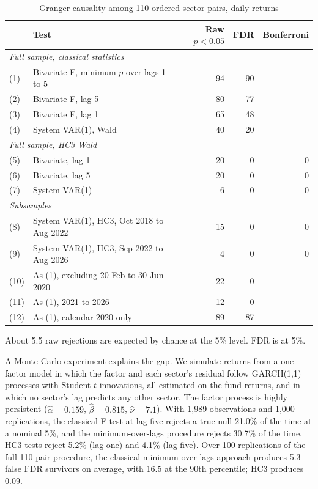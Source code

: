 \documentclass[11pt]{article}
\begin{document}
\begin{table}[H]
\centering
\caption{Granger causality among 110 ordered sector pairs, daily returns}
\label{tab:granger}
\small
\begin{tabular}{llrrr}
\toprule
& Test & Raw $p<0.05$ & FDR & Bonferroni \\
\midrule
\multicolumn{5}{l}{\textit{Full sample, classical statistics}} \\
(1) & Bivariate F, minimum $p$ over lags 1 to 5 & 94 & 90 & \\
(2) & Bivariate F, lag 5 & 80 & 77 & \\
(3) & Bivariate F, lag 1 & 65 & 48 & \\
(4) & System VAR(1), Wald & 40 & 20 & \\
\multicolumn{5}{l}{\textit{Full sample, HC3 Wald}} \\
(5) & Bivariate, lag 1 & 20 & 0 & 0 \\
(6) & Bivariate, lag 5 & 20 & 0 & 0 \\
(7) & System VAR(1) & 6 & 0 & 0 \\
\multicolumn{5}{l}{\textit{Subsamples}} \\
(8) & System VAR(1), HC3, Oct 2018 to Aug 2022 & 15 & 0 & 0 \\
(9) & System VAR(1), HC3, Sep 2022 to Aug 2026 & 4 & 0 & 0 \\
(10) & As (1), excluding 20 Feb to 30 Jun 2020 & 22 & 0 & \\
(11) & As (1), 2021 to 2026 & 12 & 0 & \\
(12) & As (1), calendar 2020 only & 89 & 87 & \\
\bottomrule
\end{tabular}

\smallskip
\parbox{0.95\textwidth}{\footnotesize About 5.5 raw rejections are expected by chance at the 5\% level. FDR is \citet{benjamini1995} at 5\%.}
\end{table}

A Monte Carlo experiment explains the gap. We simulate returns from a one-factor model in which the factor and each sector's residual follow GARCH(1,1) processes with Student-$t$ innovations, all estimated on the fund returns, and in which no sector's lag predicts any other sector. The factor process is highly persistent ($\hat\alpha=0.159$, $\hat\beta=0.815$, $\hat\nu=7.1$). With 1,989 observations and 1,000 replications, the classical F-test at lag five rejects a true null 21.0\% of the time at a nominal 5\%, and the minimum-over-lags procedure rejects 30.7\% of the time. HC3 tests reject 5.2\% (lag one) and 4.1\% (lag five). Over 100 replications of the full 110-pair procedure, the classical minimum-over-lags approach produces 5.3 false FDR survivors on average, with 16.5 at the 90th percentile; HC3 produces 0.09.
\end{document}
